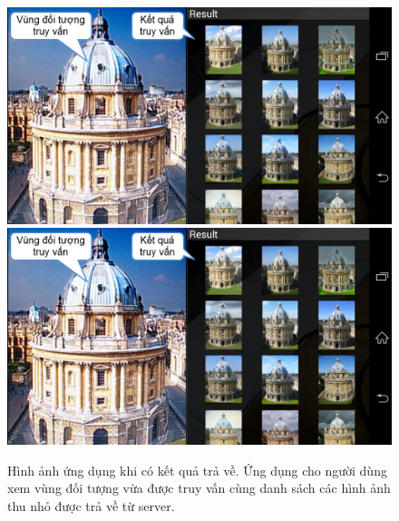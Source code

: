 \begin{figure}[!htbp]
  \begin{center}
    \leavevmode
    \ifpdf
      \includegraphics[scale=0.35]{interface_3}
    \else
      \includegraphics[scale=0.35]{interface_3}
    \fi
    \caption[Hình ảnh ứng dụng khi có kết quả trả về]{Hình ảnh ứng dụng khi có kết quả trả về. Ứng dụng cho người dùng xem vùng đối tượng vừa được truy vấn cùng danh sách các hình ảnh thu nhỏ được trả về từ server.}
    \label{FigInterface3}
  \end{center}
\end{figure}

